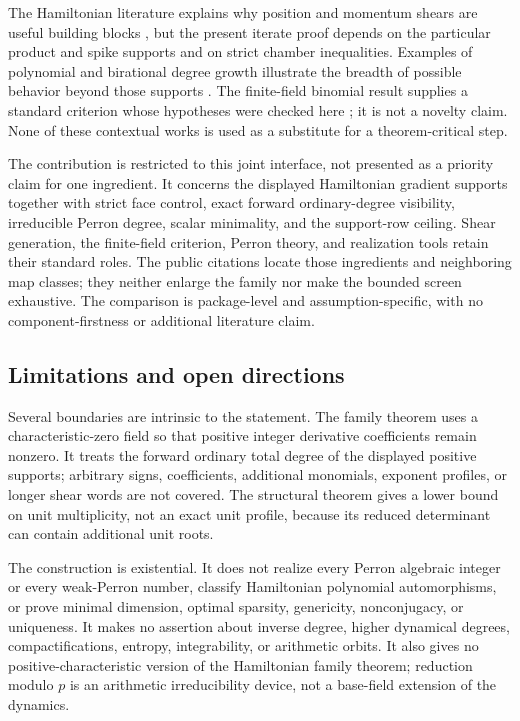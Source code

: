\documentclass[11pt,letterpaper]{article}
\theoremstyle{plain}
\begin{document}
The Hamiltonian literature explains why position and momentum shears are useful building blocks \cite{BT,KL}, but the present iterate proof depends on the particular product and spike supports and on strict chamber inequalities.  Examples of polynomial and birational degree growth illustrate the breadth of possible behavior beyond those supports \cite{Des}.  The finite-field binomial result supplies a standard criterion whose hypotheses were checked here \cite{HS}; it is not a novelty claim.  None of these contextual works is used as a substitute for a theorem-critical step.

The contribution is restricted to this joint interface, not presented as a priority claim for one ingredient.  It concerns the displayed Hamiltonian gradient supports together with strict face control, exact forward ordinary-degree visibility, irreducible Perron degree, scalar minimality, and the support-row ceiling.  Shear generation, the finite-field criterion, Perron theory, and realization tools retain their standard roles.  The public citations locate those ingredients and neighboring map classes; they neither enlarge the family nor make the bounded screen exhaustive.  The comparison is package-level and assumption-specific, with no component-firstness or additional literature claim.

\subsection{Limitations and open directions}

Several boundaries are intrinsic to the statement.  The family theorem uses a characteristic-zero field so that positive integer derivative coefficients remain nonzero.  It treats the forward ordinary total degree of the displayed positive supports; arbitrary signs, coefficients, additional monomials, exponent profiles, or longer shear words are not covered.  The structural theorem gives a lower bound on unit multiplicity, not an exact unit profile, because its reduced determinant can contain additional unit roots.

The construction is existential.  It does not realize every Perron algebraic integer or every weak-Perron number, classify Hamiltonian polynomial automorphisms, or prove minimal dimension, optimal sparsity, genericity, nonconjugacy, or uniqueness.  It makes no assertion about inverse degree, higher dynamical degrees, compactifications, entropy, integrability, or arithmetic orbits.  It also gives no positive-characteristic version of the Hamiltonian family theorem; reduction modulo $p$ is an arithmetic irreducibility device, not a base-field extension of the dynamics.
\end{document}
